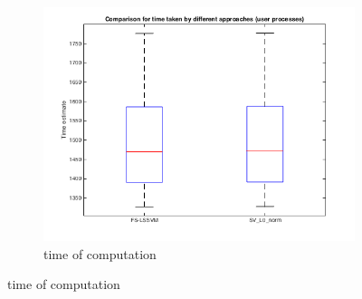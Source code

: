 \documentclass[11pt,oneside,a4paper]{article}
\begin{document}
\begin{figure}[H]
\begin{subfigure}[b]{0.4\textwidth}
		\includegraphics[width=\textwidth]{../Figures/time_c}
		\caption{time of computation}
	\end{subfigure}
\end{figure}
\end{document}
